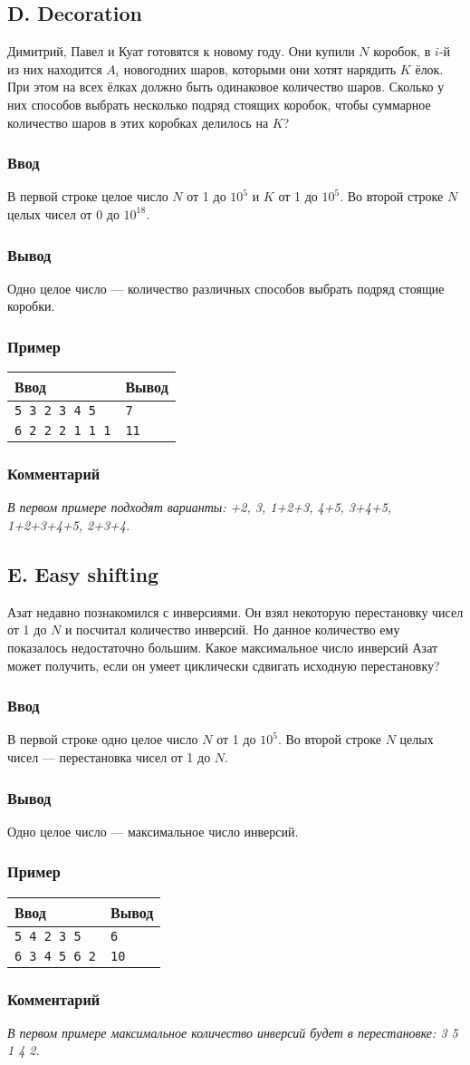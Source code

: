\documentclass[10pt, a4paper]{article}
\newcommand{\informat}[1]
{
	\subsubsection*{Ввод} #1
}
\newcommand{\outformat}[1]
{
	\subsubsection*{Вывод} #1
}
\newcommand{\examplee}[4]
{
	\subsubsection*{Пример}
	\noindent
	\begin{center}
	\begin{tabularx}{\linewidth}{|X|X|}
	\hline
	Ввод 	& Вывод  	\\
	\hline
	{\tt #1} & {\tt #2}	\\
	\hline
	{\tt #3} & {\tt #4}	\\
	\hline
	\end{tabularx}
	\end{center}
}
\newcommand{\excomm}[1]
{
	\subsubsection*{Комментарий}
	\textit{#1}
}
\begin{document}
\subsection*{D. Decoration}


Димитрий, Павел и Куат готовятся к новому году. Они купили $N$ коробок, в $i$-й из них находится $A_i$ новогодних шаров, которыми они хотят нарядить $K$ ёлок. При этом на всех ёлках должно быть одинаковое количество шаров. Сколько у них способов выбрать несколько подряд стоящих коробок, чтобы суммарное количество шаров в этих коробках делилось на $K$?

\informat{В первой строке целое число $N$ от 1 до $10^5$ и $K$ от 1 до $10^5$. \newline
Во второй строке $N$ целых чисел от 0 до $10^{18}$.}

\outformat{Одно целое число --- количество различных способов выбрать подряд стоящие коробки.}

\examplee
{5 3  2 3 4 5}
{7}
{6 2 \newline
2 2 2 1 1 1}
{11}

\excomm{В первом примере подходят варианты: \newline 1+2, 3, 1+2+3, 4+5, 3+4+5, 1+2+3+4+5, 2+3+4.}



\subsection*{E. Easy shifting}


Азат недавно познакомился с инверсиями. Он взял некоторую перестановку чисел от 1 до $N$ и посчитал количество инверсий. Но данное количество ему показалось недостаточно большим. Какое максимальное число инверсий Азат может получить, если он умеет циклически сдвигать исходную перестановку?

\informat{В первой строке одно целое число $N$ от 1 до $10^5$. \newline 
Во второй строке $N$ целых чисел --- перестановка чисел от 1 до $N$.}

\outformat{Одно целое число --- максимальное число инверсий.}

\examplee
{5 \newline
1 4 2 3 5}
{6}
{6 \newline
1 3 4 5 6 2}
{10}

\excomm{В первом примере максимальное количество инверсий будет в перестановке: 3 5 1 4 2.}
\end{document}

